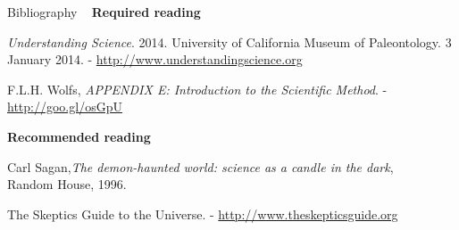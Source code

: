 \documentclass[t]{beamer}
\begin{document}



\begin{ftst}
{Bibliography}
{\ }
\scriptsize
\textbf{Required reading}

\benums \textit{Understanding Science}. 2014. University of California Museum of Paleontology. 3 January 2014. - 
{\tiny \url{http://www.understandingscience.org}}
	\item F.L.H. Wolfs, \textit{APPENDIX E: Introduction to the Scientific Method}. - 
	{\tiny \url{http://goo.gl/osGpU}}
\eenum

\textbf{Recommended reading}

\benums Carl Sagan,\textit{The demon-haunted world: science as a candle in the dark},\\Random House, 1996.
	\item The Skeptics Guide to the Universe. - 
	{\tiny \url{http://www.theskepticsguide.org}}
\eenum
\end{ftst}



\end{document}
